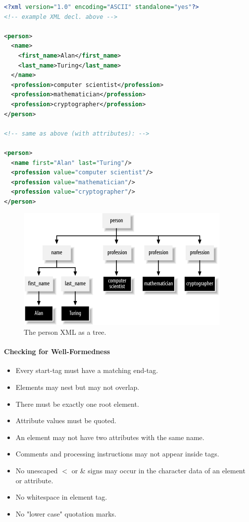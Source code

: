 


\begin{lstlisting}[language=XML]
<?xml version="1.0" encoding="ASCII" standalone="yes"?>
<!-- example XML decl. above -->

<person>
  <name>
    <first_name>Alan</first_name>
    <last_name>Turing</last_name>
  </name>
  <profession>computer scientist</profession>
  <profession>mathematician</profession>
  <profession>cryptographer</profession>
</person>

<!-- same as above (with attributes): -->

<person>
  <name first="Alan" last="Turing"/>
  <profession value="computer scientist"/>
  <profession value="mathematician"/>
  <profession value="cryptographer"/>
</person>
\end{lstlisting}

\begin{figure}[h]
	\centering
	\includegraphics[scale=0.6]{images/2-xmltree.png}
	\caption{The person XML as a tree.}
	\label{fig:xmltree}
\end{figure}

\paragraph{Checking for Well-Formedness}
\begin{itemize}
    \item Every start-tag must have a matching end-tag.
    \item Elements may nest but may not overlap.
    \item There must be exactly one root element.
    \item Attribute values must be quoted.
    \item An element may not have two attributes with the same name.
    \item Comments and processing instructions may not appear inside tags.
    \item No unescaped $<$ or \& signs may occur in the character data of an element or attribute.
    \item No whitespace in element tag.
    \item No "lower case" quotation marks.
\end{itemize} %

